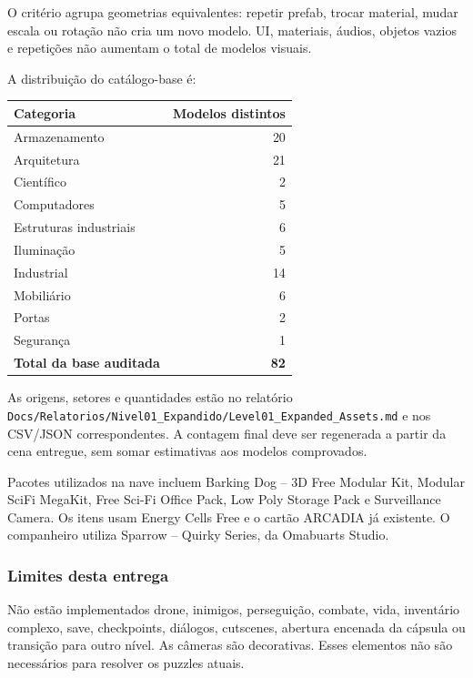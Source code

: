 \documentclass[12pt,a4paper]{article}
\begin{document}
O critério agrupa geometrias equivalentes: repetir prefab, trocar
material, mudar escala ou rotação não cria um novo modelo.
UI, materiais, áudios, objetos vazios e repetições não aumentam
o total de modelos visuais.

A distribuição do catálogo-base é:

\begin{center}
\begin{tabularx}{\textwidth}{|X|r|}
\hline
\textbf{Categoria} & \textbf{Modelos distintos}\\
\hline
Armazenamento & 20\\
Arquitetura & 21\\
Científico & 2\\
Computadores & 5\\
Estruturas industriais & 6\\
Iluminação & 5\\
Industrial & 14\\
Mobiliário & 6\\
Portas & 2\\
Segurança & 1\\
\hline
\textbf{Total da base auditada} & \textbf{82}\\
\hline
\end{tabularx}
\end{center}

As origens, setores e quantidades estão no relatório
\texttt{Docs/Relatorios/Nivel01\_Expandido/Level01\_Expanded\_Assets.md}
e nos CSV/JSON correspondentes. A contagem final deve ser
regenerada a partir da cena entregue, sem somar estimativas
aos modelos comprovados.

Pacotes utilizados na nave incluem Barking Dog -- 3D Free Modular
Kit, Modular SciFi MegaKit, Free Sci-Fi Office Pack, Low Poly
Storage Pack e Surveillance Camera. Os itens usam Energy Cells
Free e o cartão ARCADIA já existente. O companheiro utiliza
Sparrow -- Quirky Series, da Omabuarts Studio.

\subsubsection*{Limites desta entrega}

Não estão implementados drone, inimigos, perseguição, combate,
vida, inventário complexo, save, checkpoints, diálogos,
cutscenes, abertura encenada da cápsula ou transição para outro nível.
As câmeras são decorativas. Esses elementos não são necessários
para resolver os puzzles atuais.
\end{document}
